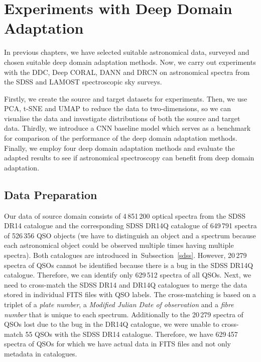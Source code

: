 \chapter{Experiments with Deep Domain Adaptation}
\label{exp_chapter}

In previous chapters, we have selected suitable astronomical data, surveyed and chosen suitable deep domain adaptation methods. Now, we carry out experiments with the DDC, Deep CORAL, DANN and DRCN on astronomical spectra from the SDSS and LAMOST spectroscopic sky surveys.

Firstly, we create the source and target datasets for experiments. Then, we use PCA, t-SNE and UMAP to reduce the data to two-dimensions, so we can visualise the data and investigate distributions of both the source and target data. Thirdly, we introduce a CNN baseline model which serves as a benchmark for comparison of the performance of the deep domain adaptation methods. Finally, we employ four deep domain adaptation methods and evaluate the adapted results to see if astronomical spectroscopy can benefit from deep domain adaptation.

\section{Data Preparation}
\label{data_preparation}

Our data of source domain consists of 4\,851\,200 optical spectra from the SDSS DR14 catalogue
and the corresponding SDSS DR14Q catalogue of 649\,791 spectra of 526\,356 QSO objects
(we have to distinguish an object and a spectrum
because each astronomical object could be observed multiple times having multiple spectra).
Both catalogues are introduced in~Subsection~\ref{sdss}.
However, 20\,279 spectra of QSOs cannot be identified
because there is a bug in the SDSS DR14Q catalogue.
Therefore, we can identify only 629\,512 spectra of all QSOs.
Next, we need to cross-match the SDSS DR14 and DR14Q catalogues
to merge the data stored in individual FITS files with QSO labels.
The cross-matching is based on a triplet of a \textit{plate number}, a \textit{Modified Julian Date of observation} and a \textit{fibre number}
that is unique to each spectrum.
Additionally to the 20\,279 spectra of QSOs lost due to the bug in the DR14Q catalogue,
we were unable to cross-match 55 QSOs with the SDSS DR14 catalogue.
Therefore, we have 629\,457 spectra of QSOs
for which we have actual data in FITS files and not only metadata in catalogues.

